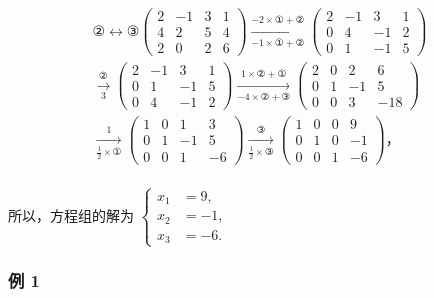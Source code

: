 \[
\begin{array}{l} \text {②} \leftrightarrow \text {③} \left( \begin{array}{cccc} 2 & - 1 & 3 & 1 \\ 4 & 2 & 5 & 4 \\ 2 & 0 & 2 & 6 \end{array} \right) \xrightarrow [ - 1 \times ① + ② ]{- 2 \times ① + ②} \left( \begin{array}{cccc} 2 & - 1 & 3 & 1 \\ 0 & 4 & - 1 & 2 \\ 0 & 1 & - 1 & 5 \end{array} \right) \\ \xrightarrow [ 3 ]{②} \left( \begin{array}{cccc} 2 & - 1 & 3 & 1 \\ 0 & 1 & - 1 & 5 \\ 0 & 4 & - 1 & 2 \end{array} \right) \xrightarrow [ - 4 \times ② + ③ ]{1 \times ② + ①} \left( \begin{array}{cccc} 2 & 0 & 2 & 6 \\ 0 & 1 & - 1 & 5 \\ 0 & 0 & 3 & - 18 \end{array} \right) \\ \xrightarrow [ \frac {1}{2} \times ① ]{1} \left( \begin{array}{cccc} 1 & 0 & 1 & 3 \\ 0 & 1 & - 1 & 5 \\ 0 & 0 & 1 & - 6 \end{array} \right) \xrightarrow [ \frac {1}{2} \times ③ ]{③} \left( \begin{array}{cccc} 1 & 0 & 0 & 9 \\ 0 & 1 & 0 & - 1 \\ 0 & 0 & 1 & - 6 \end{array} \right)\text{，} \\ \end{array}
\]

所以，方程组的解为
\(\left\{\begin{aligned}x_{1}&=9,\\ x_{2}&=-1,\\ x_{3}&=-6.\end{aligned}\right.\)

\subsubsection{例 1}


